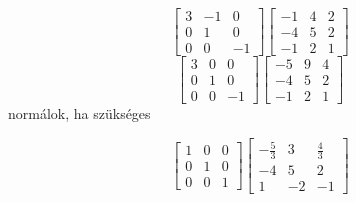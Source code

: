 \documentclass[12pt]{article}
\begin{document}
$$\left[{\begin{array}{ccc}3& -1& 0\\ 0& 1& 0\\ 0& 0& -1\end{array}}\right]\left[{\begin{array}{ccc}-1& 4& 2\\ -4& 5& 2\\ -1& 2& 1\end{array}}\right]$$
$$\left[{\begin{array}{ccc}3& 0& 0\\ 0& 1& 0\\ 0& 0& -1\end{array}}\right]\left[{\begin{array}{ccc}-5& 9& 4\\ -4& 5& 2\\ -1& 2& 1\end{array}}\right]$$
normálok, ha szükséges

$$\left[{\begin{array}{ccc}1& 0& 0\\ 0& 1& 0\\ 0& 0& 1\end{array}}\right]\left[{\begin{array}{ccc}-\frac{5}{3}& 3& \frac{4}{3}\\ -4& 5& 2\\ 1& -2& -1\end{array}}\right]$$
\end{document}
